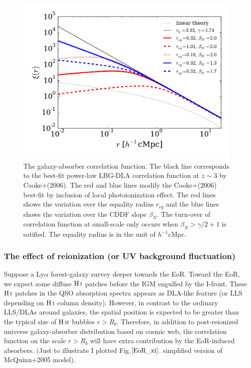 \documentclass[useAMS,usenatbib,twocolumn]{mn2e}
\newcommand{\HI}{{\rm H\,{\scriptstyle I}}}
\newcommand{\HII}{{\rm H\,{\scriptstyle II}}}
\newcommand{\LyA}{\mbox{Ly}\alpha}
\begin{document}
\begin{figure}
 \begin{center}
  \includegraphics[angle=0,width=\columnwidth]{figure/corrfunc.pdf}
  \caption{The galaxy-absorber correlation function. The black line corresponds
    to the best-fit power-law LBG-DLA correlation function at $z\sim3$ by
    Cooke+(2006). The red and blue lines modify the Cooke+(2006) best-fit
    by inclusion of local photoionization effect. The red lines shows the 
    variation over the equality radius $r_{eq}$ and the blue lines shows the
    variation over the CDDF slope $\beta_N$.
    The turn-over of correlation function at
    small-scale only occurs when $\beta_N>\gamma/2+1$ is satified. 
    The equality radius is in the unit of $h^{-1}$cMpc.}
   \label{EoR_xi}
 \end{center}
\end{figure}


\subsubsection{The effect of reionization (or UV background fluctuation)}
Suppose a $\LyA$ forest-galaxy survey deeper towards the EoR. Toward the 
EoR, we expect some diffuse $\HI$ patches before the IGM engulfed by
the I-front. These $\HI$ patches in the QSO absorption spectra appears
as DLA-like feature (or LLS depending on $\HI$ column density). However,
in contrast to the ordinary LLS/DLAs around galaxies, the spatial position
is expected to be greater than the typical size of $\HII$ bubbles $r>R_b$. 
Therefore, in addition to post-reionized universe galaxy-absorber distribution
based on cosmic web, the correlation function on the scale $r>R_b$ will 
have extra contribution by the EoR-induced absorbers. (Just to illustrate
I plotted Fig.$\ref{EoR_xi}$. simplified version of McQuinn+2005 model).
\end{document}
